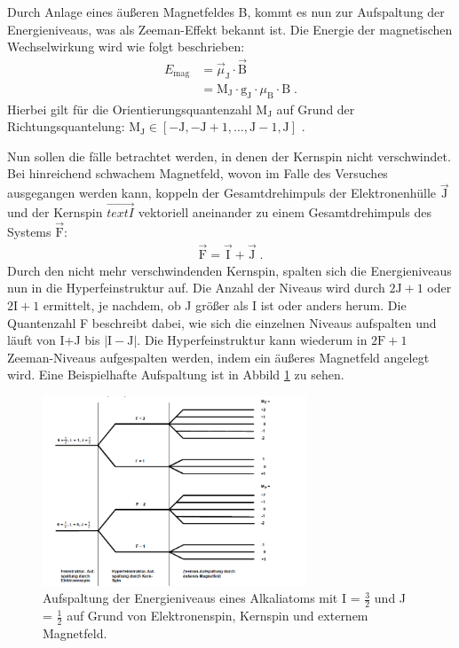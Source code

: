 Durch Anlage eines äußeren Magnetfeldes B, kommt es nun zur Aufspaltung der Energieniveaus, was als Zeeman-Effekt bekannt ist. Die Energie der magnetischen Wechselwirkung wird wie folgt beschrieben:
\begin{align}
    E_{\text{mag}} &= \vec{\mu}_{\text{J}} \cdot \vec{\text{B}} \\
    &= \text{M}_\text{J} \cdot \text{g}_\text{J} \cdot \mu_{\text{B}} \cdot \text{B} \; .
    \label{eq:E_mag}
\end{align}
Hierbei gilt für die Orientierungsquantenzahl $\text{M}_\text{J}$ auf Grund der Richtungsquantelung: $\text{M}_{\text{J}} \in [-\text{J}, -\text{J}+1,\hdots,\text{J}-1,\text{J}]$ .

\noindent Nun sollen die fälle betrachtet werden, in denen der Kernspin nicht verschwindet.
Bei hinreichend schwachem Magnetfeld, wovon im Falle des Versuches ausgegangen werden kann, koppeln der Gesamtdrehimpuls der Elektronenhülle $\vec{\text{J}}$ und der Kernspin $\vec{text{I}}$ vektoriell aneinander zu einem Gesamtdrehimpuls des Systems $\vec{\text{F}}$:
\begin{align*}
    \vec{\text{F}} = \vec{\text{I}} + \vec{\text{J}} \; .
\end{align*}
Durch den nicht mehr verschwindenden Kernspin, spalten sich die Energieniveaus nun in die Hyperfeinstruktur auf.
Die Anzahl der Niveaus wird durch $2\text{J}+1$ oder $2\text{I}+1$ ermittelt, je nachdem, ob J größer als I ist oder anders herum.
Die Quantenzahl F beschreibt dabei, wie sich die einzelnen Niveaus aufspalten und läuft von I+J bis $|\text{I}-\text{J}|$.
Die Hyperfeinstruktur kann wiederum in $2\text{F}+1$ Zeeman-Niveaus aufgespalten werden, indem ein äußeres Magnetfeld angelegt wird.
Eine Beispielhafte Aufspaltung ist in Abbild \ref{abb:Aufspaltung} zu sehen.
\FloatBarrier
\begin{figure}
    \centering
    \includegraphics[width=0.7\textwidth]{Aufspaltung.PNG}
    \caption{Aufspaltung der Energieniveaus eines Alkaliatoms mit I = $\frac{3}{2}$ und J = $\frac{1}{2}$ auf Grund von Elektronenspin, Kernspin und externem Magnetfeld. \cite{Q1}}
    \label{abb:Aufspaltung}
\end{figure}
